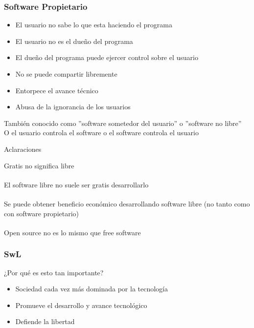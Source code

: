 \documentclass{beamer}
\begin{document}
\begin{frame}\frametitle{Software Propietario}

    \begin{itemize}
        \item El usuario no sabe lo que esta haciendo el programa
        \item El usuario no es el dueño del programa
        \item El dueño del programa puede ejercer control sobre el usuario
        \item No se puede compartir libremente
        \item Entorpece el avance técnico
        \item Abusa de la ignorancia de los usuarios
    \end{itemize}

    También conocido como ''software sometedor del usuario'' o ''software no
    libre''
    \\
    O el usuario controla el software o el software controla el usuario

\end{frame}


\begin{frame}{Aclaraciones}
    \begin{center}
        Gratis no significa libre     \\~\\

        El software libre no suele ser gratis desarrollarlo\\~\\

        Se puede obtener beneficio económico desarrollando software libre
        (no tanto como con software propietario)
        \\~\\
        Open source no es lo mismo que free software
    \end{center}
\end{frame}

\begin{frame}\frametitle{SwL}
    \begin{block}{¿Por qué es esto tan importante?}
        \begin{itemize}
                \item Sociedad cada vez más dominada por la tecnología
                \item Promueve el desarrollo y avance tecnológico
                \item Defiende la libertad
        \end{itemize}
    \end{block}
\end{frame}
\end{document}
